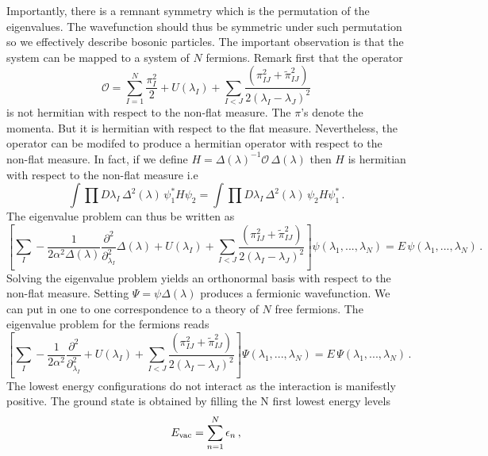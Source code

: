 \documentclass[a4paper]{article}
\begin{document}
Importantly, there is a remnant symmetry which is the permutation of the eigenvalues. The wavefunction should thus be symmetric under such permutation so we effectively describe bosonic particles. The important observation is that the system can be mapped to a system of $N$ fermions. Remark first that the operator 
\begin{equation}
  \mathcal{O}=\sum_{I=1}^N \frac{\pi_I^2}{2} + U(\lambda_I) +\sum_{I<J}\frac{(\pi_{IJ}^2+\tilde{\pi}^2_{IJ})}{2(\lambda_I-\lambda_J)^2}
\end{equation}
is not hermitian with respect to the non-flat measure. The $\pi$'s denote the momenta. But it is hermitian with respect to the flat measure. Nevertheless, the operator can be modifed to produce a hermitian operator with respect to the non-flat measure. In fact, if we define $H = \Delta(\lambda)^{-1} \mathcal{O}\,\Delta(\lambda)$ then $H$ is hermitian with respect to the non-flat measure i.e
\begin{equation}
  \int \prod D\lambda_I \, \Delta^2(\lambda) \, \psi_1^* H \psi_2 =  \int \prod D\lambda_I \, \Delta^2(\lambda) \,\psi_2 H \psi_1^*\,.
\end{equation}
The eigenvalue problem can thus be written as 
\begin{equation}
  \left[\sum_{I} -\frac{1}{2\alpha^2 \Delta(\lambda)} \frac{\partial^2}{\partial_{\lambda_I}^2}\Delta(\lambda) + U(\lambda_I) + \sum_{I<J} \frac{(\pi_{IJ}^2+\tilde{\pi}^2_{IJ})}{2(\lambda_I-\lambda_J)^2}\right] \psi(\lambda_1,...,\lambda_N) = E\,\psi(\lambda_1,...,\lambda_N)\,.
\end{equation}
Solving the eigenvalue problem yields an orthonormal basis with respect to the non-flat measure. Setting $\Psi = \psi \Delta(\lambda)$ produces a fermionic wavefunction. We can put in one to one correspondence to a theory of $N$ free fermions. The eigenvalue problem for the fermions reads
\begin{equation}
  \left[\sum_{I} -\frac{1}{2\alpha^2} \frac{\partial^2}{\partial_{\lambda_I}^2} + U(\lambda_I) + \sum_{I<J} \frac{(\pi_{IJ}^2+\tilde{\pi}^2_{IJ})}{2(\lambda_I-\lambda_J)^2}\right] \Psi(\lambda_1,...,\lambda_N) = E\,\Psi(\lambda_1,...,\lambda_N)\,.
\end{equation}
The lowest energy configurations do not interact as the interaction is manifestly positive. The ground state is obtained by filling the N first lowest energy levels
\begin{equation}
  E_{\rm vac} = \sum_{n=1}^N \epsilon_n\,,
\end{equation}
\end{document}
